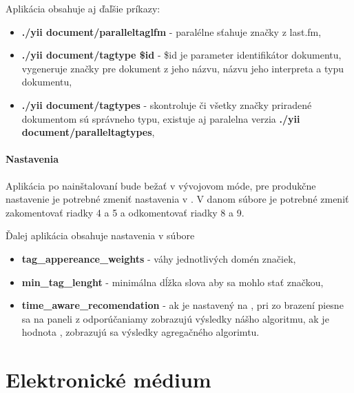 Aplikácia obsahuje aj ďaľšie príkazy:

\begin{itemize}
\item{\textbf{./yii document/paralleltaglfm} - paralélne sťahuje značky z last.fm},
\item{\textbf{./yii document/tagtype \$id} - \$id je parameter identifikátor dokumentu,
    vygeneruje značky pre dokument z jeho názvu, názvu jeho interpreta a typu dokumentu,}
\item{\textbf{./yii document/tagtypes} - skontroluje či všetky značky priradené dokumentom
    sú správneho typu, existuje aj paralelna verzia \textbf{./yii document/paralleltagtypes},}
\end{itemize}

\paragraph{Nastavenia}

Aplikácia po nainštalovaní bude bežať v vývojovom móde, pre produkčne nastavenie je 
potrebné zmeniť nastavenia v . V danom súbore je potrebné zmeniť
zakomentovať riadky 4 a 5 a odkomentovať riadky 8 a 9.

Ďalej aplikácia obsahuje nastavenia v súbore 

\begin{itemize}
\item{\textbf{tag\_appereance\_weights} - váhy jednotlivých domén značiek,}
\item{\textbf{min\_tag\_lenght} - minimálna dĺžka slova aby sa mohlo stať značkou,}
\item{\textbf{time\_aware\_recomendation} - ak je nastavený na , pri zo brazení
    piesne sa na paneli z odporúčaniamy zobrazujú výsledky nášho algoritmu, ak
    je hodnota , zobrazujú sa výsledky agregačného algorimtu.}
\end{itemize}

\section{Elektronické médium}

